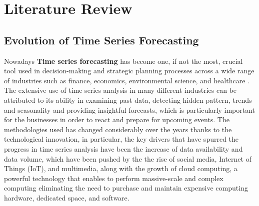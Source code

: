 \chapter{Literature Review}

\section{Evolution of Time Series Forecasting}
Nowadays \textbf{Time series forecasting} has become one, if not the most, crucial tool used in decision-making and strategic planning processes across a wide range of industries such as finance, economics, environmental science, and healthcare \cite{article}. The extensive use of time series analysis in many different industries can be attributed to its ability in examining past data, detecting hidden pattern, trends and seasonality and providing insightful forecasts, which is particularly important for the businesses in order to react and prepare for upcoming events. The methodologies used has changed considerably over the years thanks to the technological innovation, in  particular, the key drivers that have spurred the progress in time series analysis have been the increase of data availability and data volume, which have been pushed by the the rise of social media, Internet of Things (IoT), and multimedia, along with the growth of cloud computing, a powerful technology that enables to perform massive-scale and complex computing eliminating the need to purchase and maintain expensive computing hardware, dedicated space, and software\cite{HASHEM201598}.
